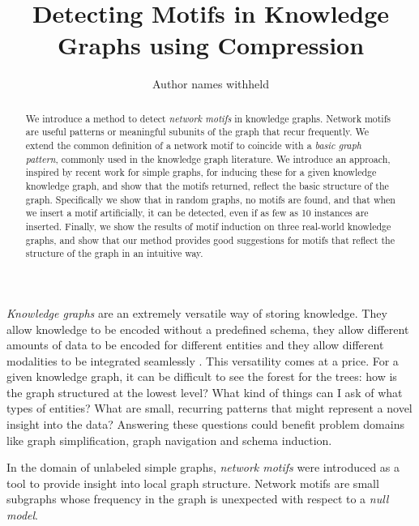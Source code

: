 \documentclass[letterpaper]{article} %
\title{Detecting Motifs in Knowledge Graphs using Compression}
\author{
Author names withheld
}
\newcommand{\G}{{\cal G}}
\begin{document}
\maketitle

\begin{abstract}
\noindent We introduce a method to detect \emph{network motifs} in knowledge graphs. Network motifs are useful patterns or meaningful subunits of the graph that recur frequently. We extend the common definition of a network motif to coincide with a \emph{basic graph pattern}, commonly used in the knowledge graph literature. We introduce an approach, inspired by recent work for simple graphs, for inducing these for a given knowledge knowledge graph, and show that the motifs returned, reflect the basic structure of the graph. Specifically we show that in random graphs, no motifs are found, and that when we insert a motif artificially, it can be detected, even if as few as 10 instances are inserted. Finally, we show the results of motif induction on three real-world knowledge graphs, and show that our method provides good suggestions for motifs that reflect the structure of the graph in an intuitive way.
\end{abstract}

\noindent \emph{Knowledge graphs} are an extremely versatile way of storing knowledge. They allow knowledge to be encoded without a predefined schema, they allow different amounts of data to be encoded for different entities and they allow different modalities to be integrated seamlessly \cite{wilcke2017knowledge}. This versatility comes at a price. For a given knowledge graph, it can be difficult to see the forest for the trees: how is the graph structured at the lowest level? What kind of things can I ask of what types of entities? What are small, recurring patterns that might represent a novel insight into the data? Answering these questions could benefit problem domains like graph simplification, graph navigation and schema induction.

In the domain of unlabeled simple graphs, \emph{network motifs} \cite{milo2002network} were introduced as a tool to provide insight into local graph structure. Network motifs are small subgraphs whose frequency in the graph is unexpected with respect to a \emph{null model}. 

\end{document}

